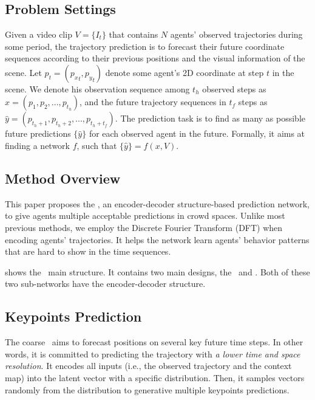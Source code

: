 \documentclass[../paper.tex]{subfiles}
\begin{document}
    
\section{\MODEL}

\subsection{Problem Settings}

Given a video clip $V = \{I_t\}$ that contains $N$ agents' observed trajectories during some period, the trajectory prediction is to forecast their future coordinate sequences according to their previous positions and the visual information of the scene.
Let $p_t = ({p_x}_t, {p_y}_t)$ denote some agent's 2D coordinate at step $t$ in the scene.
We denote his observation sequence among $t_h$ observed steps as $x = (p_1, p_2, ..., p_{t_h})$, and the future trajectory sequences in $t_f$ steps as $\hat{y} = (p_{t_h + 1}, p_{t_h + 2}, ..., p_{t_h + t_f})$.
The prediction task is to find as many as possible future predictions $\{\hat{y}\}$ for each observed agent in the future.
Formally, it aims at finding a network $f$, such that $\{\hat{y}\} = f(x, V)$.

\subsection{Method Overview}



This paper proposes the \MODEL, an encoder-decoder structure-based prediction network, to give agents multiple acceptable predictions in crowd spaces.
Unlike most previous methods, we employ the Discrete Fourier Transform (DFT) when encoding agents' trajectories.
It helps the network learn agents' behavior patterns that are hard to show in the time sequences.

 shows the \MODEL~main structure.
It contains two main designs, the \ALPHAMODEL~and \BETAMODEL.
Both of these two sub-networks have the encoder-decoder structure.



\subsection{Keypoints Prediction}

The coarse \ALPHAMODEL~aims to forecast positions on several key future time steps.
In other words, it is committed to predicting the trajectory with \emph{a lower time and space resolution}.
It encodes all inputs (i.e., the observed trajectory and the context map) into the latent vector with a specific distribution.
Then, it samples vectors randomly from the distribution to generative multiple keypoints predictions.
\end{document}
